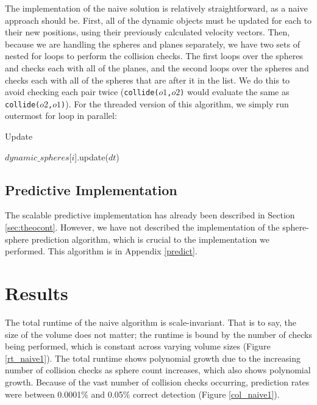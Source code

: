 \documentclass[CEJCS,PDF]{cej} %
\begin{document}
The implementation of the naive solution is relatively straightforward, as a naive approach should be.  First, all of the dynamic objects must be updated for each  to their new positions, using their previously calculated velocity vectors.  Then, because we are handling the spheres and planes separately, we have two sets of nested for loops to perform the collision checks.  The first loops over the spheres and checks each with all of the planes, and the second loops over the spheres and checks each with all of the spheres that are after it in the list.  We do this to avoid checking each pair twice (\texttt{collide($o1$,$o2$)} would evaluate the same as \texttt{collide($o2$,$o1$)}). For the threaded version of this algorithm, we simply run outermost for loop in parallel:

\begin{algorithm}
\caption{Update}
\begin{algorithmic}
	\STATE $dynamic\_spheres$[$i$].update($dt$)
\ENDFOR
\end{algorithmic}
\end{algorithm}

\subsection{Predictive Implementation}

The scalable predictive implementation has already been described in Section \ref{sec:theocont}.  However, we have not described the implementation of the sphere-sphere prediction algorithm, which is crucial to the 
implementation we performed.  This algorithm is in Appendix \ref{predict}.

\section{Results} 
\label{results}
The total runtime of the naive algorithm is scale-invariant.  That is to say, the size of the volume does not matter; the runtime is bound by the number of checks being performed, which is constant across varying volume sizes (Figure \ref{rt_naive1}).  The total runtime shows polynomial growth due to the increasing number of collision checks as sphere count increases, which also shows polynomial growth.  Because of the vast number of collision checks occurring, prediction rates were between 0.0001\% and 0.05\% correct detection (Figure \ref{col_naive1}).
\end{document}
